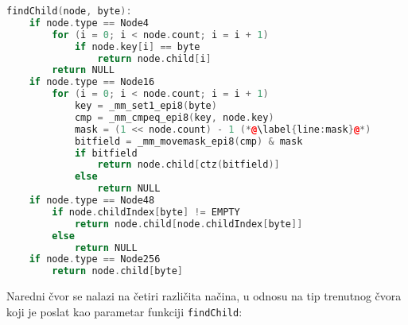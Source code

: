 \documentclass[12pt,oneside]{memoir}
\begin{document}
\begin{lstlisting}[language=C++,
                   caption={Algoritam pronalaska idućeg čvora pretrage},
                   label={art:algoritam_findChild}]
findChild(node, byte):
    if node.type == Node4
        for (i = 0; i < node.count; i = i + 1)
            if node.key[i] == byte
                return node.child[i]
        return NULL
    if node.type == Node16
        for (i = 0; i < node.count; i = i + 1)
            key = _mm_set1_epi8(byte)
            cmp = _mm_cmpeq_epi8(key, node.key)
            mask = (1 << node.count) - 1 (*@\label{line:mask}@*)
            bitfield = _mm_movemask_epi8(cmp) & mask
            if bitfield
                return node.child[ctz(bitfield)]
            else
                return NULL
    if node.type == Node48
        if node.childIndex[byte] != EMPTY
            return node.child[node.childIndex[byte]]
        else
            return NULL
    if node.type == Node256
        return node.child[byte]
\end{lstlisting}

\noindent Naredni čvor se nalazi na četiri različita načina, u odnosu na
tip trenutnog čvora koji je poslat kao parametar funkciji
\texttt{findChild}:
\end{document}
